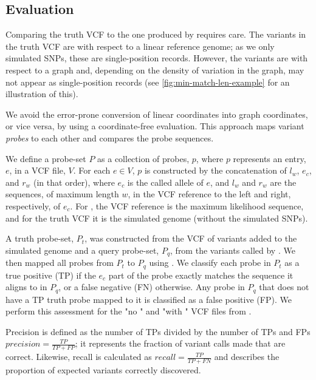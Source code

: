 \subsection{Evaluation}
\label{sec:denovo-sims-eval}

Comparing the truth VCF to the one produced by \pandora{} requires care. The variants in the truth VCF are with respect to a linear reference genome; as we only simulated SNPs, these are single-position records. However, the \pandora{} variants are with respect to a graph and, depending on the density of variation in the graph, may not appear as single-position records (see \autoref{fig:min-match-len-example} for an illustration of this). 

We avoid the error-prone conversion of linear coordinates into graph coordinates, or vice versa, by using a coordinate-free evaluation. This approach maps variant \emph{probes} to each other and compares the probe sequences.  

We define a probe-set $P$ as a collection of probes, $p$, where $p$ represents an entry, $e$, in a VCF file, $V$. For each $e \in V$, $p$ is constructed by the concatenation of $l_w$, $e_c$, and $r_w$ (in that order), where $e_c$ is the called allele of $e$, and $l_w$ and $r_w$ are the sequences, of maximum length $w$, in the VCF reference to the left and right, respectively, of $e_c$. For \pandora{}, the VCF reference is the maximum likelihood sequence, and for the truth VCF it is the simulated genome (without the simulated SNPs).

A truth probe-set, $P_t$, was constructed from the VCF of variants added to the simulated genome and a query probe-set, $P_q$, from the variants called by \pandora{}. We then mapped all probes from $P_t$ to $P_q$ using  \cite{li2013}. We classify each probe in $P_t$ as a true positive (TP) if the $e_c$ part of the probe exactly matches the sequence it aligns to in $P_q$, or a false negative (FN) otherwise. Any probe in $P_q$ that does not have a TP truth probe mapped to it is classified as a false positive (FP). We perform this assessment for the "no \denovo{}" and "with \denovo{}" VCF files from \pandora{}. 

Precision is defined as the number of TPs divided by the number of TPs and FPs $precision=\frac{TP}{TP+FP}$; it represents the fraction of variant calls made that are correct. Likewise, recall is calculated as $recall=\frac{TP}{TP+FN}$ and describes the proportion of expected variants correctly discovered.

